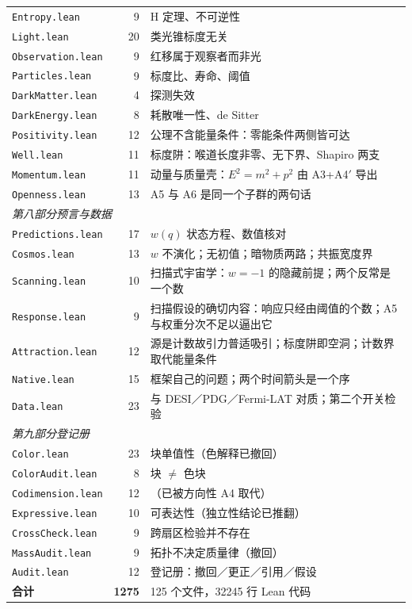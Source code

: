 \documentclass[11pt,a4paper]{article}
\theoremstyle{sudef}
\begin{document}
\begin{center}
\begin{longtable}{lrl}
\texttt{Entropy.lean} & 9 & H 定理、不可逆性 \\
\texttt{Light.lean} & 20 & 类光锥标度无关 \\
\texttt{Observation.lean} & 9 & 红移属于观察者而非光 \\
\texttt{Particles.lean} & 9 & 标度比、寿命、阈值 \\
\texttt{DarkMatter.lean} & 4 & 探测失效 \\
\texttt{DarkEnergy.lean} & 8 & 耗散唯一性、de Sitter \\
\texttt{Positivity.lean} & 12 & 公理不含能量条件：零能条件两侧皆可达 \\
\texttt{Well.lean} & 11 & 标度阱：喉道长度非零、无下界、Shapiro 两支 \\
\texttt{Momentum.lean} & 11 & 动量与质量壳：$E^2=m^2+p^2$ 由 A3+A4$'$ 导出 \\
\texttt{Openness.lean} & 13 & A5 与 A6 是同一个子群的两句话 \\
\midrule
\multicolumn{3}{l}{\emph{第八部分\quad 预言与数据}}\\
\texttt{Predictions.lean} & 17 & $w(q)$ 状态方程、数值核对 \\
\texttt{Cosmos.lean} & 13 & $w$ 不演化；无初值；暗物质两路；共振宽度界 \\
\texttt{Scanning.lean} & 10 & 扫描式宇宙学：$w=-1$ 的隐藏前提；两个反常是一个数 \\
\texttt{Response.lean} & 9 & 扫描假设的确切内容：响应只经由阈值的个数；A5 与权重分次不足以逼出它 \\
\texttt{Attraction.lean} & 12 & 源是计数故引力普适吸引；标度阱即空洞；计数界取代能量条件 \\
\texttt{Native.lean} & 15 & 框架自己的问题；两个时间箭头是一个序 \\
\texttt{Data.lean} & 23 & 与 DESI／PDG／Fermi-LAT 对质；第二个开关检验 \\
\midrule
\multicolumn{3}{l}{\emph{第九部分\quad 登记册}}\\
\texttt{Color.lean} & 23 & 块单值性（色解释已撤回） \\
\texttt{ColorAudit.lean} & 8 & 块 $\ne$ 色块 \\
\texttt{Codimension.lean} & 12 & （已被方向性 A4 取代） \\
\texttt{Expressive.lean} & 10 & 可表达性（独立性结论已推翻） \\
\texttt{CrossCheck.lean} & 9 & 跨扇区检验并不存在 \\
\texttt{MassAudit.lean} & 9 & 拓扑不决定质量律（撤回） \\
\texttt{Audit.lean} & 12 & 登记册：撤回／更正／引用／假设 \\
\midrule
\textbf{合计} & \textbf{1275} & 125 个文件，32245 行 Lean 代码 \\
\bottomrule
\end{longtable}
\end{center}
\end{document}
